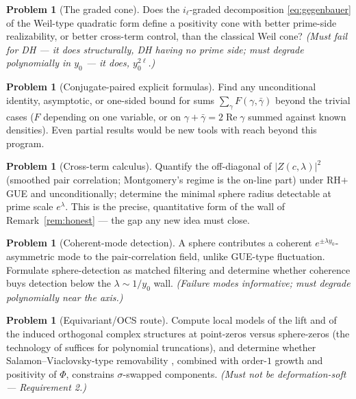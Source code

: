 \documentclass[11pt]{amsart}
\theoremstyle{plain}
\theoremstyle{definition}
\newtheorem{problem}[theorem]{Problem}
\theoremstyle{remark}
\newcommand{\re}{\operatorname{Re}}
\begin{document}
\begin{problem}[The graded cone]\label{prob:cone}
Does the $i_\ell$-graded decomposition \eqref{eq:gegenbauer} of the Weil-type quadratic form
define a positivity cone with better prime-side realizability, or better cross-term control,
than the classical Weil cone? \emph{(Must fail for DH --- it does structurally, DH having no
prime side; must degrade polynomially in $y_0$ --- it does, $y_0^{2\ell}$.)}
\end{problem}

\begin{problem}[Conjugate-paired explicit formulas]\label{prob:paired}
Find any unconditional identity, asymptotic, or one-sided bound for sums
$\sum_\gamma F(\gamma,\bar\gamma)$ beyond the trivial cases ($F$ depending on one variable, or
on $\gamma+\bar\gamma=2\re\gamma$ summed against known densities). Even partial results would
be new tools with reach beyond this program.
\end{problem}

\begin{problem}[Cross-term calculus]\label{prob:cross}
Quantify the off-diagonal of $|Z(c,\lambda)|^2$ (smoothed pair correlation; Montgomery's regime
\cite{Montgomery1973} is the on-line part) under RH$+$GUE and unconditionally; determine the
minimal sphere radius detectable at prime scale $e^\lambda$. This is the precise, quantitative
form of the wall of Remark~\ref{rem:honest} --- the gap any new idea must close.
\end{problem}

\begin{problem}[Coherent-mode detection]\label{prob:matched}
A sphere contributes a coherent $e^{\pm\lambda y_0}$-asymmetric mode to the pair-correlation
field, unlike GUE-type fluctuation. Formulate sphere-detection as matched filtering and
determine whether coherence buys detection below the $\lambda\sim1/y_0$ wall.
\emph{(Failure modes informative; must degrade polynomially near the axis.)}
\end{problem}

\begin{problem}[Equivariant/OCS route]\label{prob:ocs}
Compute local models of the lift and of the induced orthogonal complex structures at point-zeros
versus sphere-zeros (the technology of \cite{GSS2014,Altavilla2018,AltavillaSarfatti2019}
suffices for polynomial truncations), and determine whether Salamon--Viaclovsky-type
removability \cite{SalamonViaclovsky2009}, combined with order-$1$ growth and positivity of
$\Phi$, constrains $\sigma$-swapped components. \emph{(Must not be deformation-soft ---
Requirement 2.)}
\end{problem}
\end{document}
